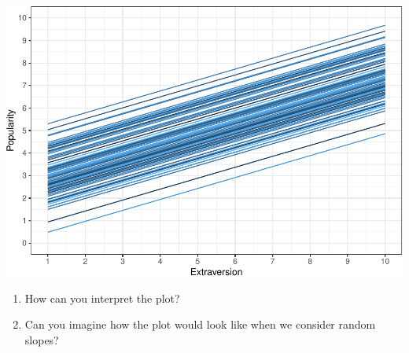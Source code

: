 \documentclass[
]{book}
\begin{document}
\includegraphics{PSY202B-Modeling-I.Heo_files/figure-latex/unnamed-chunk-9-1.pdf}

\begin{enumerate}
\def\labelenumi{\arabic{enumi}.}
\setcounter{enumi}{1}
\item
  How can you interpret the plot?
\item
  Can you imagine how the plot would look like when we consider random slopes?
\end{enumerate}

  
\end{document}
